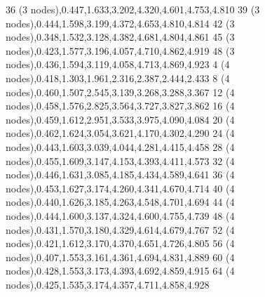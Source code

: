 \documentclass[11pt]{article}
\begin{document}
\begin{table}[H]
{36 (3 nodes),0.447,1.633,3.202,4.320,4.601,4.753,4.810
39 (3 nodes),0.444,1.598,3.199,4.372,4.653,4.810,4.814
42 (3 nodes),0.348,1.532,3.128,4.382,4.681,4.804,4.861
45 (3 nodes),0.423,1.577,3.196,4.057,4.710,4.862,4.919
48 (3 nodes),0.436,1.594,3.119,4.058,4.713,4.869,4.923
4 (4 nodes),0.418,1.303,1.961,2.316,2.387,2.444,2.433
8 (4 nodes),0.460,1.507,2.545,3.139,3.268,3.288,3.367
12 (4 nodes),0.458,1.576,2.825,3.564,3.727,3.827,3.862
16 (4 nodes),0.459,1.612,2.951,3.533,3.975,4.090,4.084
20 (4 nodes),0.462,1.624,3.054,3.621,4.170,4.302,4.290
24 (4 nodes),0.443,1.603,3.039,4.044,4.281,4.415,4.458
28 (4 nodes),0.455,1.609,3.147,4.153,4.393,4.411,4.573
32 (4 nodes),0.446,1.631,3.085,4.185,4.434,4.589,4.641
36 (4 nodes),0.453,1.627,3.174,4.260,4.341,4.670,4.714
40 (4 nodes),0.440,1.626,3.185,4.263,4.548,4.701,4.694
44 (4 nodes),0.444,1.600,3.137,4.324,4.600,4.755,4.739
48 (4 nodes),0.431,1.570,3.180,4.329,4.614,4.679,4.767
52 (4 nodes),0.421,1.612,3.170,4.370,4.651,4.726,4.805
56 (4 nodes),0.407,1.553,3.161,4.361,4.694,4.831,4.889
60 (4 nodes),0.428,1.553,3.173,4.393,4.692,4.859,4.915
64 (4 nodes),0.425,1.535,3.174,4.357,4.711,4.858,4.928
}
\end{table}
\end{document}
